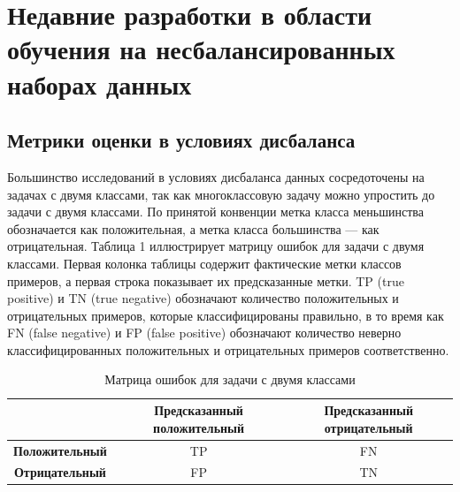 \documentclass{article}
\begin{document}
\section{Недавние разработки в области обучения на несбалансированных наборах данных}
\subsection{Метрики оценки в условиях дисбаланса }
Большинство исследований в условиях дисбаланса данных сосредоточены на задачах с двумя классами, так как многоклассовую задачу можно упростить до задачи с двумя классами. По принятой конвенции метка класса меньшинства обозначается как положительная, а метка класса большинства — как отрицательная. Таблица 1 иллюстрирует матрицу ошибок для задачи с двумя классами. Первая колонка таблицы содержит фактические метки классов примеров, а первая строка показывает их предсказанные метки. TP (true positive) и TN (true negative) обозначают количество положительных и отрицательных примеров, которые классифицированы правильно, в то время как FN (false negative) и FP (false positive) обозначают количество неверно классифицированных положительных и отрицательных примеров соответственно.
\begin{table}[h]
\centering
\caption{Матрица ошибок для задачи с двумя классами}
\begin{tabular}{|c|c|c|}
\hline
 & \textbf{Предсказанный положительный} & \textbf{Предсказанный отрицательный} \\
\hline
\textbf{Положительный} & TP & FN \\
\hline
\textbf{Отрицательный} & FP & TN \\
\hline
\end{tabular}
\end{table}
\end{document}
